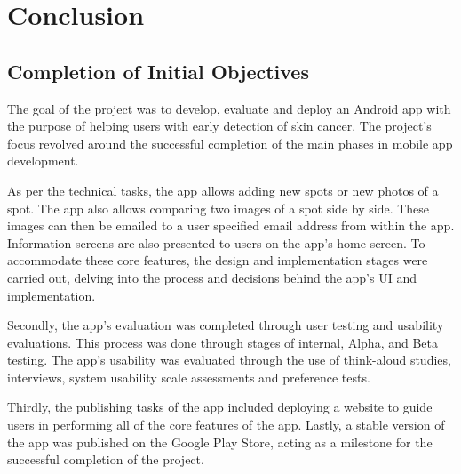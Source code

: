 \chapter{Conclusion}
\section{Completion of Initial Objectives}
The goal of the project was to develop, evaluate and deploy an Android app with the purpose of helping users with early detection of skin cancer. The project's focus revolved around the successful completion of the main phases in mobile app development.

As per the technical tasks, the app allows adding new spots or new photos of a spot. The app also allows comparing two images of a spot side by side. These images can then be emailed to a user specified email address from within the app. Information screens are also presented to users on the app's home screen. To accommodate these core features, the design and implementation stages were carried out, delving into the process and decisions behind the app's UI and implementation.

Secondly, the app's evaluation was completed through user testing and usability evaluations. This process was done through stages of internal, Alpha, and Beta testing. The app's usability was evaluated through the use of think-aloud studies, interviews, system usability scale assessments and preference tests.

Thirdly, the publishing tasks of the app included deploying a website to guide users in performing all of the core features of the app. Lastly, a stable version of the app was published on the Google Play Store, acting as a milestone for the successful completion of the project.


